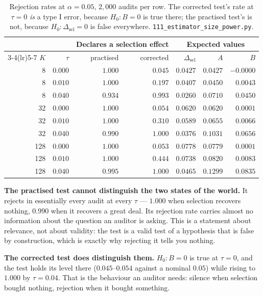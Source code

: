 \documentclass{article}
\begin{document}
\begin{table}[h]
\centering
\small
\begin{tabular}{@{}rrrrrrr@{}}
\toprule
& & \multicolumn{2}{c}{Declares a selection effect} & \multicolumn{3}{c}{Expected values} \\
\cmidrule(lr){3-4}\cmidrule(lr){5-7}
$K$ & $\tau$ & practised & corrected & $\Delta_{\text{sel}}$ & $A$ & $B$ \\
\midrule
 8 & $0.000$ & $1.000$ & $0.045$ & $0.0427$ & $0.0427$ & $-0.0000$ \\
 8 & $0.010$ & $1.000$ & $0.197$ & $0.0407$ & $0.0450$ & $0.0043$ \\
 8 & $0.040$ & $0.934$ & $0.993$ & $0.0260$ & $0.0710$ & $0.0450$ \\
\midrule
 32 & $0.000$ & $1.000$ & $0.054$ & $0.0620$ & $0.0620$ & $0.0001$ \\
 32 & $0.010$ & $1.000$ & $0.310$ & $0.0589$ & $0.0655$ & $0.0066$ \\
 32 & $0.040$ & $0.990$ & $1.000$ & $0.0376$ & $0.1031$ & $0.0656$ \\
\midrule
128 & $0.000$ & $1.000$ & $0.053$ & $0.0778$ & $0.0779$ & $0.0001$ \\
128 & $0.010$ & $1.000$ & $0.444$ & $0.0738$ & $0.0820$ & $0.0083$ \\
128 & $0.040$ & $0.995$ & $1.000$ & $0.0465$ & $0.1299$ & $0.0835$ \\
\bottomrule
\end{tabular}
\caption{Rejection rates at $\alpha=0.05$, $2{,}000$ audits per row. The
corrected test's rate at $\tau=0$ \emph{is} a type I error, because
$H_0:B=0$ is true there; the practised test's is not, because
$H_0:\Delta_{\text{sel}}=0$ is false everywhere.
\texttt{111\_estimator\_size\_power.py}.}
\label{tab:sizepower}
\end{table}

\textbf{The practised test cannot distinguish the two states of the world.}
It rejects in essentially every audit at every $\tau$ --- $1.000$ when
selection recovers nothing, $0.990$ when it recovers a great deal. Its
rejection rate carries almost no information about the question an auditor is
asking. This is a statement about relevance, not about validity: the test is
a valid test of a hypothesis that is false by construction, which is exactly
why rejecting it tells you nothing.

\textbf{The corrected test does distinguish them.} $H_0:B=0$ is true at
$\tau=0$, and the test holds its level there ($0.045$--$0.054$ against a
nominal $0.05$) while rising to $1.000$ by $\tau=0.04$. That is the behaviour
an auditor needs: silence when selection bought nothing, rejection when it
bought something.
\end{document}
